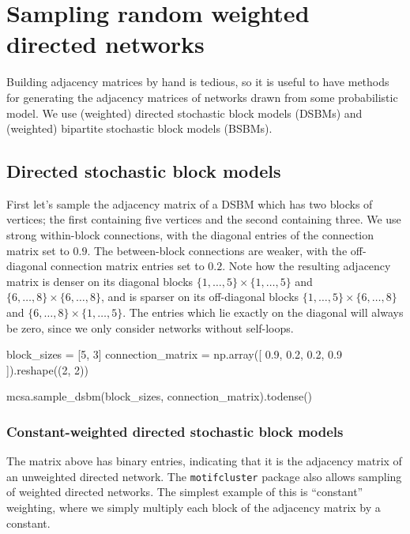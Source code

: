 \documentclass{article}
\begin{document}
\section{Sampling random weighted directed networks}

Building adjacency matrices by hand is tedious,
so it is useful to have methods for generating
the adjacency matrices of networks drawn from some probabilistic model.
We use (weighted) directed stochastic block models (DSBMs) and
(weighted) bipartite stochastic block models (BSBMs).

\subsection{Directed stochastic block models}

First let's sample the adjacency matrix of a DSBM
which has two blocks of vertices;
the first containing five vertices and the second containing three.
We use strong within-block connections,
with the diagonal entries of the connection matrix set to $0.9$.
The between-block connections are weaker, with the off-diagonal
connection matrix entries set to $0.2$.
Note how the resulting adjacency matrix is denser
on its diagonal blocks
$\{1, \dots, 5\} \times \{1, \dots, 5\}$
and
$\{6, \dots, 8\} \times \{6, \dots, 8\}$,
and is sparser on its off-diagonal blocks
$\{1, \dots, 5\} \times \{6, \dots, 8\}$
and
$\{6, \dots, 8\} \times \{1, \dots, 5\}$.
The entries which lie exactly on the diagonal will
always be zero,
since we only consider networks without self-loops.

\begin{pyconsole}
block_sizes = [5, 3]
connection_matrix = np.array([
  0.9, 0.2,
  0.2, 0.9
]).reshape((2, 2))
\end{pyconsole}

\pagebreak

\begin{pyconsole}
mcsa.sample_dsbm(block_sizes, connection_matrix).todense()
\end{pyconsole}

\subsubsection{Constant-weighted directed stochastic block models}

The matrix above has binary entries,
indicating that it is the adjacency matrix of an unweighted
directed network.
The \texttt{motifcluster} package also allows sampling of weighted directed networks.
The simplest example of this is ``constant'' weighting,
where we simply multiply each block of the adjacency matrix by a constant.
\end{document}

